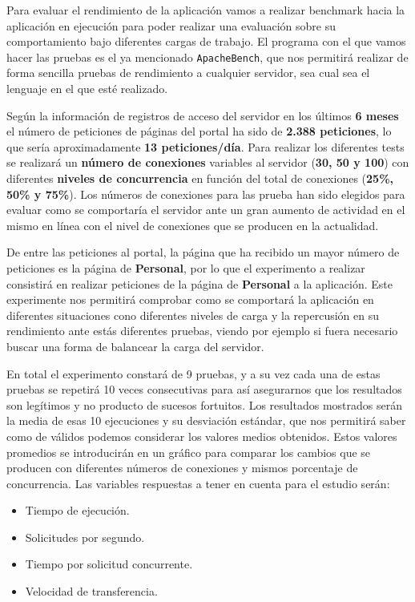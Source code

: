 Para evaluar el rendimiento de la aplicación vamos a realizar benchmark hacia la aplicación en ejecución para poder realizar una evaluación sobre su comportamiento bajo diferentes cargas de trabajo. El programa con el que vamos hacer las pruebas es el ya mencionado {\tt ApacheBench}, que nos permitirá realizar de forma sencilla pruebas de rendimiento a cualquier servidor, sea cual sea el lenguaje en el que esté realizado. 

\bigskip
Según la información de registros de acceso del servidor en los últimos \textbf{6 meses} el número de peticiones de páginas del portal ha sido de \textbf{2.388 peticiones}, lo que sería aproximadamente \textbf{13 peticiones/día}. Para realizar los diferentes tests se realizará un \textbf{número de conexiones} variables al servidor (\textbf{30, 50 y 100}) con diferentes \textbf{niveles de concurrencia} en función del total de conexiones (\textbf{25\%, 50\% y 75\%}). Los números de conexiones para las prueba han sido elegidos para evaluar como se comportaría el servidor ante un gran aumento de actividad en el mismo en línea con el nivel de conexiones que se producen en la actualidad.

\bigskip
De entre las peticiones al portal, la página que ha recibido un mayor número de peticiones es la página de \textbf{Personal}, por lo que el experimento a realizar consistirá en realizar peticiones de la página de \textbf{Personal} a la aplicación. Este experimente nos permitirá comprobar como se comportará la aplicación en diferentes situaciones cono diferentes niveles de carga y la repercusión en su rendimiento ante estás diferentes pruebas, viendo por ejemplo si fuera necesario buscar una forma de balancear la carga del servidor. 

\bigskip
En total el experimento constará de 9 pruebas, y a su vez cada una de estas pruebas se repetirá 10 veces consecutivas para así asegurarnos que los resultados son legítimos y no producto de sucesos fortuitos. Los resultados mostrados serán la media de esas 10 ejecuciones y su desviación estándar, que nos permitirá saber como de válidos podemos considerar los valores medios obtenidos. Estos valores promedios se introducirán en un gráfico para comparar los cambios que se producen con diferentes números de conexiones y mismos porcentaje de concurrencia. Las variables respuestas a tener en cuenta para el estudio serán:

\begin{itemize}
	\item Tiempo de ejecución.
	\item Solicitudes por segundo.
	\item Tiempo por solicitud concurrente.
	\item Velocidad de transferencia.
\end{itemize}

